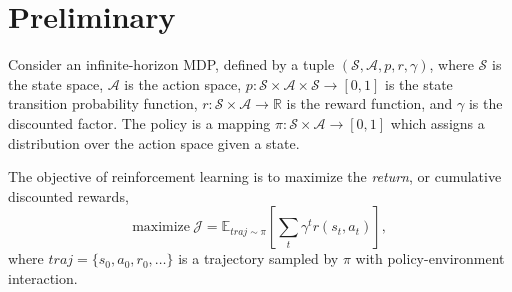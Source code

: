\section{Preliminary}
\label{sec:bg}

Consider an infinite-horizon MDP, defined by a tuple $(\mathcal{S}, \mathcal{A}, p, r, \gamma)$, where $\mathcal{S}$ is the state space, $\mathcal{A}$ is the action space, $p: \mathcal{S} \times \mathcal{A} \times \mathcal{S} \to [0, 1]$ is the state transition probability function, $r: \mathcal{S} \times \mathcal{A} \to \mathbb{R}$ is the reward function, and $\gamma$ is the discounted factor.
The policy is a mapping  $\pi: \mathcal{S} \times \mathcal{A} \to [0, 1]$ which assigns a distribution over the action space given a state. 


The objective of reinforcement learning is to maximize the \emph{return}, or cumulative discounted rewards,  { 
\begin{equation}
\mbox{maximize} \ \mathcal{J} = \mathbb{E}_{traj \sim \pi} 
\left[ \sum_t \gamma^t r(s_t, a_t)\right],
\end{equation}
where $traj = \{s_0, a_0, r_0, \dots\}$ is a trajectory sampled by $\pi$ with policy-environment interaction.}

